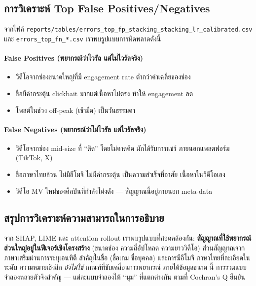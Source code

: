 \subsection{การวิเคราะห์ Top False Positives/Negatives}

จากไฟล์ \texttt{reports/tables/errors\_top\_fp\_stacking\_stacking\_lr\_calibrated.csv}
และ \texttt{errors\_top\_fn\_*.csv} เราพบรูปแบบการผิดพลาดดังนี้

\paragraph{False Positives (พยากรณ์ว่าไวรัล แต่ไม่ไวรัลจริง)}
\begin{itemize}[leftmargin=2em]
  \item วิดีโอจากช่องขนาดใหญ่ที่มี engagement rate ต่ำกว่าค่าเฉลี่ยของช่อง
  \item ชื่อมีคำกระตุ้น clickbait มากแต่เนื้อหาไม่ตรง ทำให้ engagement ลด
  \item โพสต์ในช่วง off-peak (เช้ามืด) เป็นวันธรรมดา
\end{itemize}

\paragraph{False Negatives (พยากรณ์ว่าไม่ไวรัล แต่ไวรัลจริง)}
\begin{itemize}[leftmargin=2em]
  \item วิดีโอจากช่อง mid-size ที่ ``ติด'' โดยไม่คาดคิด มักได้รับการแชร์
        ภายนอกแพลตฟอร์ม (TikTok, X)
  \item ชื่อภาษาไทยล้วน ไม่มีอีโมจิ ไม่มีคำกระตุ้น เป็นความสำเร็จที่อาศัย
        เนื้อหาในวิดีโอเอง
  \item วิดีโอ MV ใหม่ของศิลปินที่กำลังโด่งดัง — สัญญาณนี้อยู่ภายนอก meta-data
\end{itemize}

\subsection{สรุปการวิเคราะห์ความสามารถในการอธิบาย}

จาก SHAP, LIME และ attention rollout เราพบรูปแบบที่สอดคล้องกัน:
\textbf{สัญญาณที่ใช้พยากรณ์ส่วนใหญ่อยู่ในฟีเจอร์เชิงโครงสร้าง} (ขนาดช่อง
ความถี่อัปโหลด ความยาววิดีโอ) ส่วนสัญญาณจากภาษาเสริมผ่านการระบุเอนทิตี
สำคัญในชื่อ (ชื่อเกม ชื่อบุคคล) และการมีอีโมจิ ภาษาไทยที่ละเอียดในระดับ
ความหมายเชิงลึก \emph{ยังไม่ใช่} เกณฑ์ที่ขับเคลื่อนการพยากรณ์ ภายใต้ข้อมูลขนาด
นี้ การรวมแบบจำลองหลายตัวจึงสำคัญ — แต่ละแบบจำลองให้ ``มุม'' ที่แตกต่างกัน
ตามที่ Cochran's Q ยืนยัน

